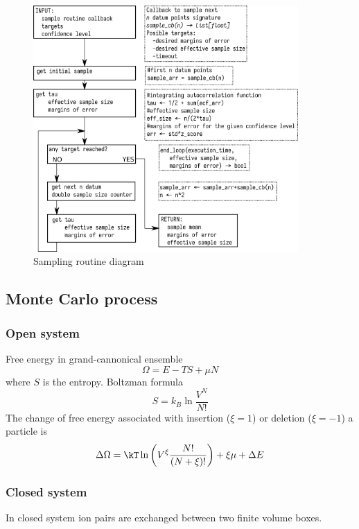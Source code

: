 \begin{figure}[t]
\includegraphics[width = 0.9\textwidth]{figures/sample_to_target_scheme.png}
\caption{Sampling routine diagram}
\label{fig: sampling_diagram}
\end{figure}

\subsection{Monte Carlo process}
\subsubsection{Open system}
Free energy in grand-cannonical ensemble
\begin{equation}
\Omega = E-TS + \mu N 
\end{equation}
where $S$ is the entropy. Boltzman formula
\begin{equation}
S= k_B \ln \frac{V^N}{N!}
\end{equation}
The change of free energy associated with insertion ($\xi=1$) or deletion ($\xi=-1$) a particle is
\begin{equation}
\Delta \Omega =\kT\ln\left(V^{\xi}\frac{N!}{ (N+\xi)!}\right)+\xi\mu+\Delta E
\end{equation}
\subsubsection{Closed system}
In closed system ion pairs are exchanged between two finite volume boxes.

